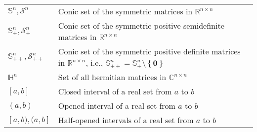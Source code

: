\documentclass{article}
\begin{document}
\begin{xltabular}{\textwidth}{XX}
    \(\mathbb{S}^{n}, \mathcal{S}^{n}\) & Conic set of the symmetric matrices in \(\mathbb{R}^{n\times n}\)\\
    \(\mathbb{S}_{+}^{n}, \mathcal{S}_{+}^{n}\) & Conic set of the symmetric positive semidefinite matrices in \(\mathbb{R}^{n\times n}\)\\
    \(\mathbb{S}_{++}^{n}, \mathcal{S}_{++}^{n}\) & Conic set of the symmetric positive definite matrices in \(\mathbb{R}^{n\times n}\), i.e., \(\mathbb{S}_{++}^{n} = \mathbb{S}_{+}^{n}\setminus \left\{ \mathbf{0} \right\}\)\\
    \(\mathbb{H}^{n}\) & Set of all hermitian matrices in \(\mathbb{C}^{n\times n}\)\\
    \([a, b]\) & Closed interval of a real set from \(a\) to \(b\)\\
    \((a, b)\) & Opened interval of a real set from \(a\) to \(b\)\\
    \([a, b), (a, b]\) & Half-opened intervals of a real set from \(a\) to \(b\)\\
\end{xltabular}
\end{document}
